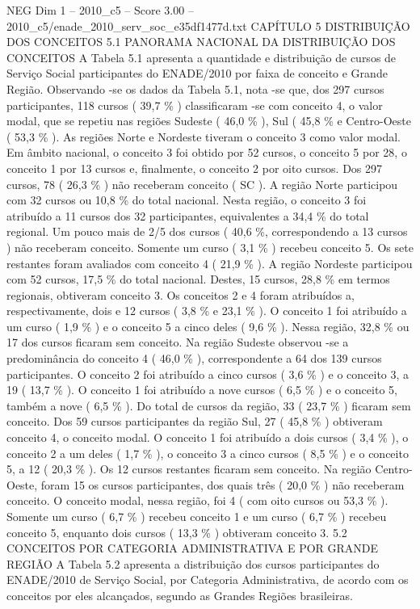 \begin{textsample}{NEG Dim 1 – 2010\_c5 – Score 3.00 – 2010\_c5/enade\_2010\_serv\_soc\_e35df1477d.txt}  \label{ex:f1_neg_310}
CAPÍTULO 5 DISTRIBUIÇÃO DOS CONCEITOS 5.1 PANORAMA NACIONAL DA DISTRIBUIÇÃO DOS CONCEITOS A Tabela 5.1 apresenta a quantidade e distribuição de cursos de Serviço Social participantes do ENADE/2010 por faixa de conceito e Grande Região.
Observando -se os dados da Tabela 5.1, nota -se que, dos 297 cursos participantes, 118 cursos ( 39,7 \% ) classificaram -se com conceito 4, o valor modal, que se repetiu nas regiões Sudeste ( 46,0 \% ), Sul ( 45,8 \% e Centro-Oeste ( 53,3 \% ).
As regiões Norte e Nordeste tiveram o conceito 3 como valor modal.
Em âmbito nacional, o conceito 3 foi obtido por 52 cursos, o conceito 5 por 28, o conceito 1 por 13 cursos e, finalmente, o conceito 2 por oito cursos.
Dos 297 cursos, 78 ( 26,3 \% ) não receberam conceito ( SC ).
A região Norte participou com 32 cursos ou 10,8 \% do total nacional.
Nesta região, o conceito 3 foi atribuído a 11 cursos dos 32 participantes, equivalentes a 34,4 \% do total regional.
Um pouco mais de 2/5 dos cursos ( 40,6 \%, correspondendo a 13 cursos ) não receberam conceito.
Somente um curso ( 3,1 \% ) recebeu conceito 5.
Os sete restantes foram avaliados com conceito 4 ( 21,9 \% ).
A região Nordeste participou com 52 cursos, 17,5 \% do total nacional.
Destes, 15 cursos, 28,8 \% em termos regionais, obtiveram conceito 3.
Os conceitos 2 e 4 foram atribuídos a, respectivamente, dois e 12 cursos ( 3,8 \% e 23,1 \% ).
O conceito 1 foi atribuído a um curso ( 1,9 \% ) e o conceito 5 a cinco deles ( 9,6 \% ).
Nessa região, 32,8 \% ou 17 dos cursos ficaram sem conceito.
Na região Sudeste observou -se a predominância do conceito 4 ( 46,0 \% ), correspondente a 64 dos 139 cursos participantes.
O conceito 2 foi atribuído a cinco cursos ( 3,6 \% ) e o conceito 3, a 19 ( 13,7 \% ).
O conceito 1 foi atribuído a nove cursos ( 6,5 \% ) e o conceito 5, também a nove ( 6,5 \% ).
Do total de cursos da região, 33 ( 23,7 \% ) ficaram sem conceito.
Dos 59 cursos participantes da região Sul, 27 ( 45,8 \% ) obtiveram conceito 4, o conceito modal.
O conceito 1 foi atribuído a dois cursos ( 3,4 \% ), o conceito 2 a um deles ( 1,7 \% ), o conceito 3 a cinco cursos ( 8,5 \% ) e o conceito 5, a 12 ( 20,3 \% ).
Os 12 cursos restantes ficaram sem conceito.
Na região Centro-Oeste, foram 15 os cursos participantes, dos quais três ( 20,0 \% ) não receberam conceito.
O conceito modal, nessa região, foi 4 ( com oito cursos ou 53,3 \% ).
Somente um curso ( 6,7 \% ) recebeu conceito 1 e um curso ( 6,7 \% ) recebeu conceito 5, enquanto dois cursos ( 13,3 \% ) obtiveram conceito 3. 5.2 CONCEITOS POR CATEGORIA ADMINISTRATIVA E POR GRANDE REGIÃO A Tabela 5.2 apresenta a distribuição dos cursos participantes do ENADE/2010 de Serviço Social, por Categoria Administrativa, de acordo com os conceitos por eles alcançados, segundo as Grandes Regiões brasileiras.

\end{textsample}
